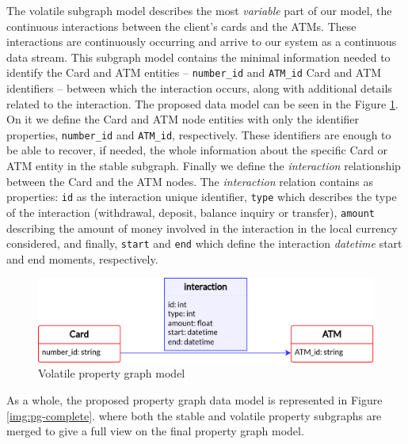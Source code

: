 The volatile subgraph model describes the most \emph{variable} part of our model, the continuous interactions between the client's cards and the ATMs. These interactions are continuously occurring and arrive to our system as a continuous data stream. 
This subgraph model contains the minimal information needed to identify the Card and ATM entities -- \texttt{number\_id} and \texttt{ATM\_id} Card and ATM identifiers -- between which the interaction occurs, along with additional details related to the interaction. 
The proposed data model can be seen in the Figure \ref{img:pg-volatile}. On it we define the Card and ATM node entities with only the identifier properties, \texttt{number\_id} and \texttt{ATM\_id}, respectively. These identifiers are enough to be able to recover, if needed, the whole information about the specific Card or ATM entity in the stable subgraph.
Finally we define the \emph{interaction} relationship between the Card and the ATM nodes.
The \emph{interaction} relation contains as properties: \texttt{id} as the interaction unique identifier, \texttt{type} which describes the type of the interaction (withdrawal, deposit, balance inquiry or transfer), \texttt{amount} describing the amount of money involved in the interaction in the local currency considered, and finally, \texttt{start} and \texttt{end} which define the interaction \emph{datetime} start and end moments, respectively.

\begin{figure}[h]
    \centering
    \includegraphics[scale = 0.8]{images/1-DataModel/schema-volatile.png}
    \caption{Volatile property graph model}
    \label{img:pg-volatile}
\end{figure}


As a whole, the proposed property graph data model is represented in Figure \ref{img:pg-complete}. where both the stable and volatile property subgraphs are merged to give a full view on the final property graph model.

